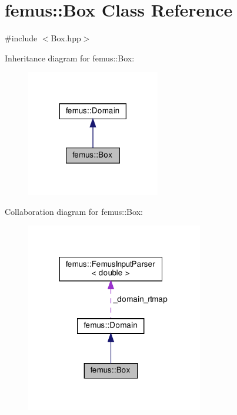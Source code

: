 \hypertarget{classfemus_1_1_box}{}\section{femus\+:\+:Box Class Reference}
\label{classfemus_1_1_box}


{\ttfamily \#include $<$Box.\+hpp$>$}



Inheritance diagram for femus\+:\+:Box\+:
\nopagebreak
\begin{figure}[H]
\begin{center}
\leavevmode
\includegraphics[width=165pt]{classfemus_1_1_box__inherit__graph}
\end{center}
\end{figure}


Collaboration diagram for femus\+:\+:Box\+:
\nopagebreak
\begin{figure}[H]
\begin{center}
\leavevmode
\includegraphics[width=219pt]{classfemus_1_1_box__coll__graph}
\end{center}
\end{figure}

